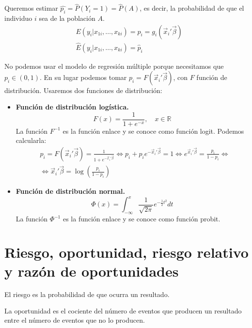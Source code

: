 Queremos estimar $\hat{p_i} = \hat{P}(Y_i = 1) = \hat{P}(A)$, es decir, la probabilidad de que el individuo $i$ sea de la población $A$.
\begin{align*}
     & E(y_i | x_{1i}, \dots, x_{ki}) = p_i = g_i(\vec{x}_i'\vec{\beta}) \\
     & \hat{E}(y_i | x_{1i}, \dots, x_{ki}) = \hat{p}_i
\end{align*}

No podemos usar el modelo de regresión múltiple porque necesitamos que $p_i \in (0, 1)$.
En su lugar podemos tomar $p_i = F(\vec{x}_i'\vec{\beta})$, con $F$ función de distribución.
Usaremos dos funciones de distribución:
\begin{itemize}
    \item \textbf{Función de distribución logística.}
          $$F(x) = \frac{1}{1 + e^{-x}}, \quad x \in \mathbb{R}$$
          La función $F^{-1}$ es la función enlace y se conoce como función logit.
          Podemos calcularla:
          \begin{align*}
               & p_i = F(\vec{x}_i'\vec{\beta}) = \frac{1}{1 + e^{-\vec{x}_i'\vec{\beta}}} \Leftrightarrow p_i + p_ie^{-\vec{x}_i'\vec{\beta}} = 1 \Leftrightarrow e^{\vec{x}_i'\vec{\beta}} = \frac{p_i}{1 - p_i} \Leftrightarrow \\
               & \Leftrightarrow \vec{x}_i'\vec{\beta} = \log\left(\frac{p_i}{1-p_i}\right)
          \end{align*}
    \item \textbf{Función de distribución normal.}
          $$\varPhi(x) = \int_{-\infty}^x \frac{1}{\sqrt{2\pi}} e^{-\frac{1}{2}t^2} dt$$
          La función $\varPhi^{-1}$ es la función enlace y se conoce como función probit.
\end{itemize}

\section{Riesgo, oportunidad, riesgo relativo y razón de oportunidades}
\begin{definition}[Riesgo]
    El riesgo es la probabilidad de que ocurra un resultado.
\end{definition}

\begin{definition}[Oportunidad]
    La oportunidad es el cociente del número de eventos que producen un resultado entre el número de eventos que no lo producen.
\end{definition}

